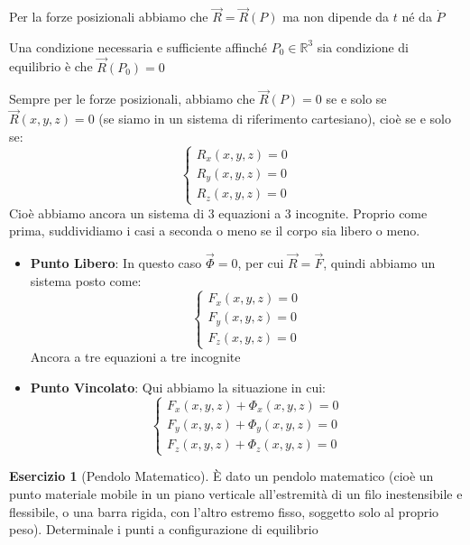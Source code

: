 \documentclass[11pt,a4paper,twoside]{article}
\theoremstyle{definition}
\newtheorem{ese}{Esercizio}[section]
\begin{document}
Per la forze posizionali abbiamo che $\vec R = \vec R(P)$ ma non dipende da $t$ né da $\dot P$

\begin{cor}{}{}
	Una condizione necessaria e sufficiente affinché $P_0 \in \mathbb R^3$ sia condizione di equilibrio è che $\vec R(P_0)=0$
\end{cor}

Sempre per le forze posizionali, abbiamo che $\vec R(P) = 0$ se e solo se $\vec R(x,y,z) = 0$ (se siamo in un sistema di riferimento cartesiano), cioè se e solo se:
\[\begin{cases}
	R_x(x,y,z) = 0\\ R_y(x,y,z) = 0\\ R_z(x,y,z) = 0
\end{cases}\]
Cioè abbiamo ancora un sistema di $3$ equazioni a $3$ incognite. Proprio come prima, suddividiamo i casi a seconda o meno se il corpo sia libero o meno.
\begin{itemize}
	\item \textbf{Punto Libero}: In questo caso $\vec \Phi = 0$, per cui $\vec R=\vec F$, quindi abbiamo un sistema posto come:
		\[\begin{cases}
			F_x(x,y,z) = 0\\ F_y(x,y,z) = 0\\ F_z(x,y,z) = 0
		\end{cases}\]
		Ancora a tre equazioni a tre incognite
	\item \textbf{Punto Vincolato}: Qui abbiamo la situazione in cui:
		\[\begin{cases}
			F_x(x,y,z) + \Phi_x(x,y,z) = 0\\
			F_y(x,y,z) + \Phi_y(x,y,z) = 0\\
			F_z(x,y,z) + \Phi_z(x,y,z) = 0
		\end{cases}\]

\end{itemize}

\begin{ese}[Pendolo Matematico]\label{pendolo}
	È dato un pendolo matematico (cioè un punto materiale mobile in un piano verticale all'estremità di un filo inestensibile e flessibile, o una barra rigida, con l'altro estremo fisso, soggetto solo al proprio peso). Determinale i punti a configurazione di equilibrio
\end{ese}
\end{document}
